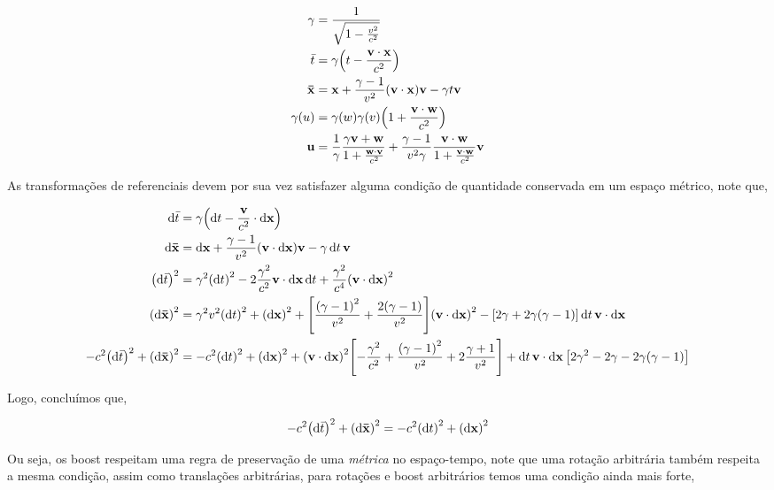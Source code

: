 \documentclass[twoside]{amsart}
\numberwithin{equation}{section}
\begin{document}
\begin{align}
    \gamma&=\frac{1}{\sqrt{1-\frac{v^2}{c^2}}}\\
    {\bar t}&=\gamma\qty(t-\frac{\vb v\cdot\vb x}{c^2})\\
    \vb {\bar x}&=\vb x+\frac{\gamma-1}{v^2}\qty(\vb v \cdot \vb x)\vb v-\gamma t\vb v\\
    \gamma\qty(u)&=\gamma\qty(w)\gamma\qty(v)\qty(1+\frac{\vb v\cdot\vb w}{c^2})\\
    \vb u&=\frac1\gamma\frac{\gamma \vb v+\vb w}{1+\frac{\vb w \cdot\vb v}{c^2}}+\frac{\gamma-1}{v^2\gamma}\frac{\vb v\cdot \vb w}{1+\frac{\vb v\cdot \vb w}{c^2}}\vb v
\end{align}

As transformações de referenciais devem por sua vez satisfazer alguma condição de quantidade conservada em um espaço métrico, note que,

\begin{align}
    \dd{{\bar t}}&=\gamma\qty(\dd{t}-\frac{\vb v}{c^2}\cdot \dd{\vb x})\\
    \dd{\vb{\bar x}}&=\dd{\vb x}+\frac{\gamma-1}{v^2}\qty(\vb v\cdot \dd{\vb x})\vb v-\gamma\dd{t}\vb v\\
    \qty(\dd{{\bar t}})^2&=\gamma^2\qty(\dd{t})^2-2\frac{\gamma^2}{c^2}\vb v\cdot \dd{\vb x}\dd{t}+\frac{\gamma^2}{c^4}\qty(\vb v\cdot \dd{\vb x})^2\\
    \qty(\dd{\vb{\bar x}})^2&=\gamma^2v^2\qty(\dd{t})^2+\qty(\dd{\vb x})^2+\qty[\frac{\qty(\gamma-1)^2}{v^2}+\frac{2\qty(\gamma-1)}{v^2}]\qty(\vb v\cdot\dd{\vb x})^2-\qty[2\gamma+2\gamma\qty(\gamma-1)]\dd{t}\vb v\cdot\dd{\vb x}\\
    -c^2\qty(\dd{{\bar t}})^2+\qty(\dd{\vb{\bar x}})^2&=-c^2\qty(\dd{t})^2+\qty(\dd{\vb x})^2+\qty(\vb v\cdot\dd{\vb x})^2\qty[-\frac{\gamma^2}{c^2}+\frac{\qty(\gamma-1)^2}{v^2}+2\frac{\gamma+1}{v^2}]+\dd{t}\vb v\cdot\dd{\vb x}\qty[2\gamma^2-2\gamma-2\gamma\qty(\gamma-1)]
\end{align}

Logo, concluímos que,

\begin{align}
    -c^2\qty(\dd{{\bar t}})^2+\qty(\dd{\vb{\bar x}})^2=-c^2\qty(\dd{{ t}})^2+\qty(\dd{\vb{ x}})^2
\end{align}

Ou seja, os boost respeitam uma regra de preservação de uma \emph{métrica} no espaço-tempo, note que uma rotação arbitrária também respeita a mesma condição, assim como translações arbitrárias, para rotações e boost arbitrários temos uma condição ainda mais forte,
\end{document}
